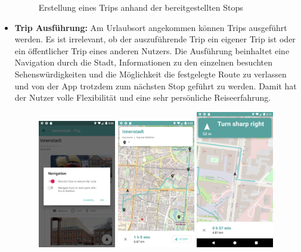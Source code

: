 \begin{itemize}
\begin{figure}[ht!]
		\caption{Erstellung eines Trips anhand der bereitgestellten Stops}
		\label{fig:ui_trip_creation}
	\end{figure}

	\newpage
	
	\item \textbf{Trip Ausführung:} Am Urlaubsort angekommen können Trips ausgeführt werden. Es ist irrelevant, ob der auszuführende Trip ein eigener Trip ist oder ein öffentlicher Trip eines anderen Nutzers. Die Ausführung beinhaltet eine Navigation durch die Stadt, Informationen zu den einzelnen besuchten Sehenswürdigkeiten und die Möglichkeit die festgelegte Route zu verlassen und von der App trotzdem zum nächsten Stop geführt zu werden. Damit hat der Nutzer volle Flexibilität und eine sehr persönliche Reiseerfahrung.
	
	\begin{figure}[ht!]
		\includegraphics[width=0.32\textwidth]{images/travlyn-screenshot-start-navigation-dialog.png}
		\includegraphics[width=0.32\textwidth]{images/travlyn-screenshot-navigation-overview.png}
		\includegraphics[width=0.32\textwidth]{images/travlyn-screenshot-navigation.png}

\end{figure}
\end{itemize}
